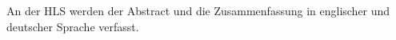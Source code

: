 An der HLS werden der Abstract und die Zusammenfassung in englischer und deutscher Sprache verfasst.